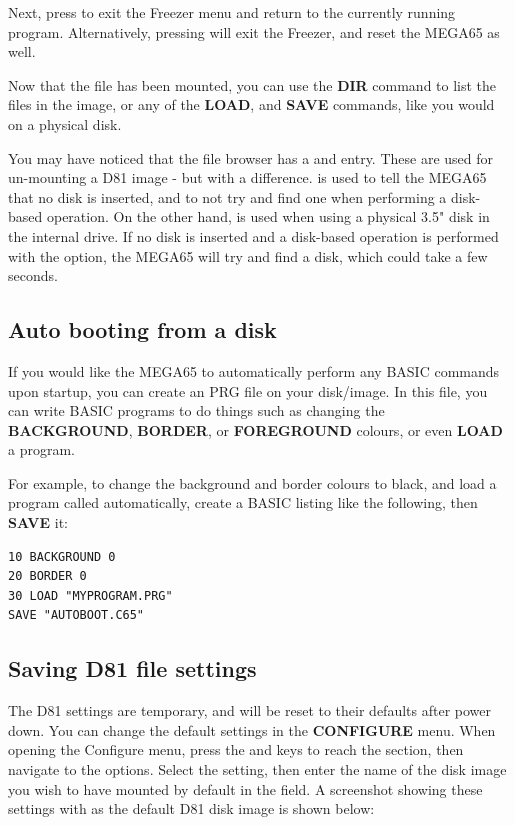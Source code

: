 Next, press  to exit the Freezer menu and return to the currently running program. Alternatively,
pressing  will exit the Freezer, and reset the MEGA65 as well.

Now that the file has been mounted, you can use
the {\bf DIR} command to list the files in the image, or any of the {\bf LOAD}, and {\bf SAVE} commands, like you
would on a physical disk.

You may have noticed that the file browser has a  and 
entry. These are used for un-mounting a D81 image - but with a difference.  is used to tell
the MEGA65 that no disk is inserted, and to not try and find one when performing a disk-based operation. On the other
hand,  is used when using a physical 3.5" disk in the internal drive. If no disk is
inserted and a disk-based operation is performed with the  option, the MEGA65 will
try and find a disk, which could take a few seconds.


\subsection{Auto booting from a disk}
If you would like the MEGA65 to automatically perform any BASIC commands upon startup, you can create an
 PRG file on your disk/image. In this file, you can write BASIC programs to do things such
as changing the {\bf BACKGROUND}, {\bf BORDER}, or {\bf FOREGROUND} colours, or even {\bf LOAD} a program.

For example, to change the background and border colours to black, and load a program called 
automatically, create a BASIC listing like the following, then {\bf SAVE} it:


\begin{tcolorbox}[colback=black,coltext=white]
\verbatimfont{\codefont}
\begin{verbatim}
10 BACKGROUND 0
20 BORDER 0
30 LOAD "MYPROGRAM.PRG"
SAVE "AUTOBOOT.C65"
\end{verbatim}
\end{tcolorbox}

\subsection{Saving D81 file settings}

The D81 settings are temporary, and will be reset to their defaults after power down. You can change the default settings
in the {\bf CONFIGURE} menu. When opening the Configure menu, press the  and  keys
to reach the  section, then navigate to the  options.
Select the  setting, then enter the name of the disk image you wish to have mounted
by default in the  field. A screenshot showing these settings with
 as the default D81 disk image is shown below:

